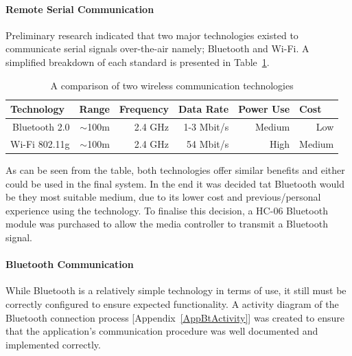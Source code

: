 \documentclass{article}
\begin{document}
			\paragraph{Remote Serial Communication}
			Preliminary research indicated that two major technologies existed to communicate serial signals over-the-air namely; Bluetooth and Wi-Fi. A simplified breakdown of each standard is presented in Table~\ref{btWiFiComparison}.
			
			\begin{table}[h]
				\centering
				\caption{A comparison of two wireless communication technologies}
				\label{btWiFiComparison}
				\begin{tabular}{|r|r|r|r|r|r|}
					\hline
					\multicolumn{1}{|l|}{Technology} & \multicolumn{1}{l|}{Range} & \multicolumn{1}{l|}{Frequency} & \multicolumn{1}{l|}{Data Rate} & \multicolumn{1}{l|}{Power Use} & \multicolumn{1}{l|}{Cost} \\ \hline
					Bluetooth 2.0                    & $\sim$100m                 & 2.4 GHz                        & 1-3 Mbit/s                     & Medium                         & Low                       \\
					Wi-Fi 802.11g                     & $\sim$100m                 & 2.4 GHz                        & 54 Mbit/s                      & High                           & Medium                    \\ \hline
				\end{tabular}
			\end{table}
			
			\noindent
			As can be seen from the table, both technologies offer similar benefits and either could be used in the final system. In the end it was decided tat Bluetooth would be they most suitable medium, due to its lower cost and previous/personal experience using the technology. To finalise this decision, a HC-06 Bluetooth module \cite{HC06DataSheet:online} was purchased to allow the media controller to transmit a Bluetooth signal.
			
			\paragraph{Bluetooth Communication}
			While Bluetooth is a relatively simple technology in terms of use, it still must be correctly configured to ensure expected functionality. A activity diagram of the Bluetooth connection process [Appendix~\ref{AppBtActivity}] was created to ensure that the application's communication procedure was well documented and implemented correctly.
			
\end{document}
